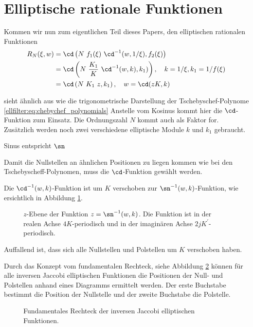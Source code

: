 \section{Elliptische rationale Funktionen}

Kommen wir nun zum eigentlichen Teil dieses Papers, den elliptischen rationalen Funktionen
\begin{align}
    R_N(\xi, w) &= \cd \left(N~f_1(\xi)~\cd^{-1}(w, 1/\xi), f_2(\xi)\right) \\
                &= \cd \left(N~\frac{K_1}{K}~\cd^{-1}(w, k), k_1)\right) , \quad k= 1/\xi, k_1 = 1/f(\xi) \\
                &= \cd \left(N~K_1~z , k_1 \right), \quad w= \cd(z K, k)
\end{align}


sieht ähnlich aus wie die trigonometrische Darstellung der Tschebyschef-Polynome \eqref{ellfilter:eq:chebychef_polynomials}
Anstelle vom Kosinus kommt hier die $\cd$-Funktion zum Einsatz.
Die Ordnungszahl $N$ kommt auch als Faktor for.
Zusätzlich werden noch zwei verschiedene elliptische Module $k$ und $k_1$ gebraucht.



Sinus entspricht $\sn$

Damit die Nullstellen an ähnlichen Positionen zu liegen kommen wie bei den Tschebyscheff-Polynomen, muss die $\cd$-Funktion gewählt werden.

Die $\cd^{-1}(w, k)$-Funktion ist um $K$ verschoben zur $\sn^{-1}(w, k)$-Funktion, wie ersichtlich in Abbildung \ref{ellfilter:fig:cd}.
\begin{figure}
    \centering
    
    \caption{
        $z$-Ebene der Funktion $z = \sn^{-1}(w, k)$.
        Die Funktion ist in der realen Achse $4K$-periodisch und in der imaginären Achse $2jK^\prime$-periodisch.
    }
    \label{ellfilter:fig:cd}
\end{figure}
Auffallend ist, dass sich alle Nullstellen und Polstellen um $K$ verschoben haben.

Durch das Konzept vom fundamentalen Rechteck, siehe Abbildung \ref{ellfilter:fig:fundamental_rectangle} können für alle inversen Jaccobi elliptischen Funktionen die Positionen der Null- und Polstellen anhand eines Diagramms ermittelt werden.
Der erste Buchstabe bestimmt die Position der Nullstelle und der zweite Buchstabe die Polstelle.
\begin{figure}
    \centering
    
    \caption{
        Fundamentales Rechteck der inversen Jaccobi elliptischen Funktionen.
    }
    \label{ellfilter:fig:fundamental_rectangle}
\end{figure}

